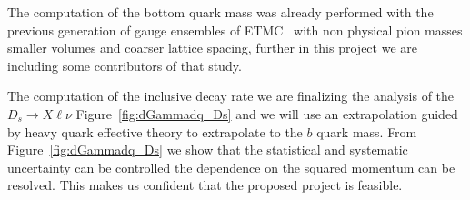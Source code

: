 
The computation of the bottom quark mass was already performed with
the previous generation of gauge ensembles of ETMC~\cite{ETM:2016nbo,ETM:2011zey} with
non physical pion masses smaller volumes and coarser lattice spacing,
further in this project  we are including some contributors of that study.

The computation of the   inclusive decay rate we are finalizing the
analysis of the $D_s\to X \ell \nu$ Figure~\ref{fig:dGammadq_Ds} and
we will use an extrapolation guided by heavy quark effective theory to extrapolate
to the $b$ quark mass.
From  Figure~\ref{fig:dGammadq_Ds} we show that the statistical and systematic
uncertainty can be controlled  the
dependence on the squared momentum can be resolved. This makes us
confident that the proposed project is feasible.

\endinput
